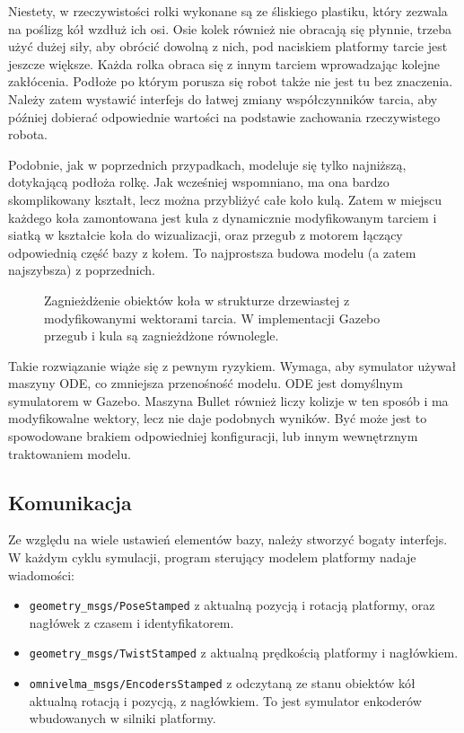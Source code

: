 		Niestety, w rzeczywistości rolki wykonane są ze śliskiego plastiku, który zezwala na poślizg kół wzdłuż ich osi.
		Osie kolek również nie obracają się płynnie, trzeba użyć dużej siły, aby obrócić dowolną z nich, pod naciskiem platformy tarcie jest jeszcze większe.
		Każda rolka obraca się z innym tarciem wprowadzając kolejne zakłócenia.
		Podłoże po którym porusza się robot także nie jest tu bez znaczenia.
		Należy zatem wystawić interfejs do łatwej zmiany współczynników tarcia, aby później dobierać odpowiednie wartości na podstawie zachowania rzeczywistego robota.

		Podobnie, jak w poprzednich przypadkach, modeluje się tylko najniższą, dotykającą podłoża rolkę.
		Jak wcześniej wspomniano, ma ona bardzo skomplikowany kształt, lecz można przybliżyć całe koło kulą.
		Zatem w miejscu każdego koła zamontowana jest kula z dynamicznie modyfikowanym tarciem i siatką w kształcie koła do wizualizacji, 
		oraz przegub z motorem łączący odpowiednią część bazy z kołem.
		To najprostsza budowa modelu (a zatem najszybsza) z poprzednich.
		
		\begin{figure}[H]
		\caption{Zagnieżdżenie obiektów koła w strukturze drzewiastej z modyfikowanymi wektorami tarcia. W implementacji Gazebo przegub i kula są zagnieżdżone równolegle.}
		\label{fig:omnivelma_wheel}
		\end{figure}

		Takie rozwiązanie wiąże się z pewnym ryzykiem.
		Wymaga, aby symulator używał maszyny ODE, co zmniejsza przenośność modelu. ODE jest domyślnym symulatorem w Gazebo.
		Maszyna Bullet również liczy kolizje w ten sposób i ma modyfikowalne wektory, 
		lecz nie daje podobnych wyników. Być może jest to spowodowane brakiem odpowiedniej konfiguracji, lub innym wewnętrznym traktowaniem modelu.

	\subsection{Komunikacja}
		Ze względu na wiele ustawień elementów bazy, należy stworzyć bogaty interfejs.
		W każdym cyklu symulacji, program sterujący modelem platformy nadaje wiadomości:
		\begin{itemize}
		\item \texttt{geometry\_msgs/PoseStamped} z aktualną pozycją i rotacją platformy, oraz nagłówek z czasem i identyfikatorem.
		\item \texttt{geometry\_msgs/TwistStamped} z aktualną prędkością platformy i nagłówkiem.
		\item \texttt{omnivelma\_msgs/EncodersStamped} z odczytaną ze stanu obiektów kół aktualną rotacją i pozycją, z nagłówkiem. 
		To jest symulator enkoderów wbudowanych w silniki platformy.
		\end{itemize}
		
